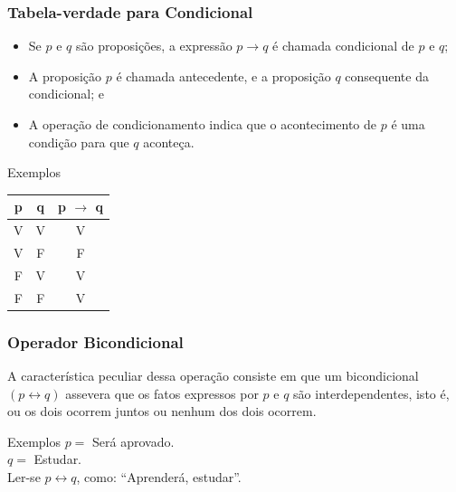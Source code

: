 \documentclass[aspectratio=169]{beamer} %
\begin{document}
\begin{frame}
\frametitle{Tabela-verdade para Condicional}

\begin{itemize}
\item Se $p$ e $q$ são proposições, a expressão $p \rightarrow q$ é chamada condicional de $p$ e $q$;
\item A proposição $p$ é chamada antecedente, e a proposição $q$ consequente da condicional; e
\item A operação de condicionamento indica que o acontecimento de $p$ é uma condição para que $q$ aconteça.
\end{itemize} \vfill

\begin{exampleblock}{Exemplos}
\center
\begin{tabular}{|c|c|c|}
	\hline
	\textbf{p} & \textbf{q} & \textbf{p $\rightarrow$ q}\\ \hline
	V & V & V \\ \hline
	V & F & F \\ \hline
	F & V & V \\ \hline
	F & F & V \\ \hline
\end{tabular}
\end{exampleblock}
\end{frame}

\begin{frame}
\frametitle{Operador Bicondicional}

A característica peculiar dessa operação consiste em que um bicondicional $(p \leftrightarrow q)$ assevera que os fatos expressos por $p$ e $q$ são interdependentes,
isto é, ou os dois ocorrem juntos ou nenhum dos dois ocorrem.\vfill

\begin{exampleblock}{Exemplos}
$p =$ Será aprovado.\\
$q =$ Estudar.\\
Ler-se $p \leftrightarrow q$, como: ``Aprenderá,  estudar''.
\end{exampleblock}
\end{frame}
\end{document}
